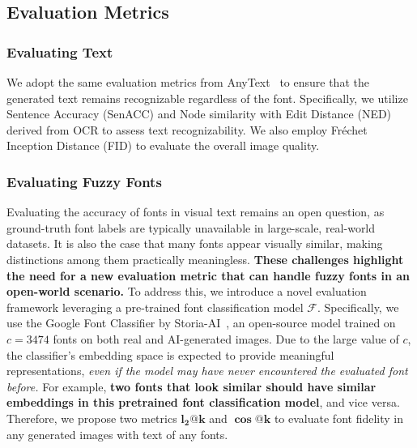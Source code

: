 \subsection{Evaluation Metrics}
\subsubsection{Evaluating Text}
We adopt the same evaluation metrics from AnyText~\cite{tuo2023anytext} to ensure that the generated text remains recognizable regardless of the font. Specifically, we utilize Sentence Accuracy (SenACC) and Node similarity with Edit Distance (NED) derived from OCR to assess text recognizability. We also employ Fréchet Inception Distance (FID) to evaluate the overall image quality.

\subsubsection{Evaluating Fuzzy Fonts}
Evaluating the accuracy of fonts in visual text remains an open question, as ground-truth font labels are typically unavailable in large-scale, real-world datasets. It is also the case that many fonts appear visually similar, making distinctions among them practically meaningless.\textbf{ These challenges highlight the need for a new evaluation metric that can handle fuzzy fonts in an open-world scenario.}
To address this, we introduce a novel evaluation framework leveraging a pre-trained font classification model $\mathcal{F}$. Specifically, we use the Google Font Classifier by Storia-AI~\cite{fontclassify2025}, an open-source model trained on $c = 3474$ fonts on both real and AI-generated images. Due to the large value of $c$, the classifier's embedding space is expected to provide meaningful representations, \textit{even if the model may have never encountered the evaluated font before.} For example, \textbf{two fonts that look similar should have similar embeddings in this pretrained font classification model}, and vice versa. Therefore, we propose two metrics $\boldsymbol{l_2@k}$ and $\boldsymbol{\cos@k}$ to evaluate font fidelity in any generated images with text of any fonts.

